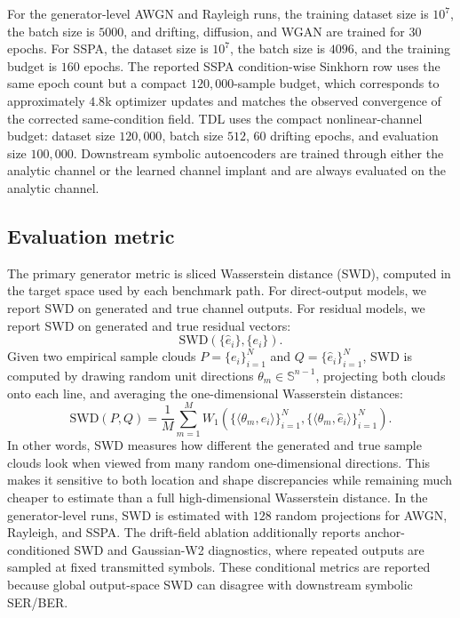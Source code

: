 For the generator-level AWGN and Rayleigh runs, the training dataset size is \(10^7\), the batch size is \(5000\), and drifting, diffusion, and WGAN are trained for \(30\) epochs.
For SSPA, the dataset size is \(10^7\), the batch size is \(4096\), and the training budget is \(160\) epochs.
The reported SSPA condition-wise Sinkhorn row uses the same epoch count but a compact \(120{,}000\)-sample budget, which corresponds to approximately \(4.8\)k optimizer updates and matches the observed convergence of the corrected same-condition field.
TDL uses the compact nonlinear-channel budget: dataset size \(120{,}000\), batch size \(512\), \(60\) drifting epochs, and evaluation size \(100{,}000\).
Downstream symbolic autoencoders are trained through either the analytic channel or the learned channel implant and are always evaluated on the analytic channel.

\subsection{Evaluation metric}
The primary generator metric is sliced Wasserstein distance (SWD), computed in the target space used by each benchmark path.
For direct-output models, we report SWD on generated and true channel outputs.
For residual models, we report SWD on generated and true residual vectors:
\begin{equation}
\mathrm{SWD}\!\left(\{\hat{e}_i\}, \{e_i\}\right).
\end{equation}
Given two empirical sample clouds \(P=\{e_i\}_{i=1}^N\) and \(Q=\{\hat e_i\}_{i=1}^N\), SWD is computed by drawing random unit directions \(\theta_m \in \mathbb{S}^{n-1}\), projecting both clouds onto each line, and averaging the one-dimensional Wasserstein distances:
\begin{equation}
\mathrm{SWD}(P,Q)
=
\frac{1}{M}
\sum_{m=1}^M
W_1\!\left(\{\langle \theta_m,e_i\rangle\}_{i=1}^N,\{\langle \theta_m,\hat e_i\rangle\}_{i=1}^N\right).
\end{equation}
In other words, SWD measures how different the generated and true sample clouds look when viewed from many random one-dimensional directions.
This makes it sensitive to both location and shape discrepancies while remaining much cheaper to estimate than a full high-dimensional Wasserstein distance.
In the generator-level runs, SWD is estimated with \(128\) random projections for AWGN, Rayleigh, and SSPA.
The drift-field ablation additionally reports anchor-conditioned SWD and Gaussian-W2 diagnostics, where repeated outputs are sampled at fixed transmitted symbols.
These conditional metrics are reported because global output-space SWD can disagree with downstream symbolic SER/BER.


